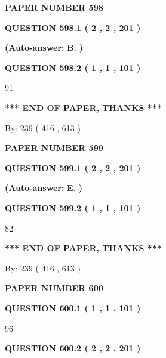 \documentclass[12pt]{article}
\begin{document}
   
\newpage 
\setcounter{page}{ 
   598001 } 
   
   
 {\textbf{ \Large{ PAPER NUMBER  598  }}}
   
   
   
   
  
  
{\textbf{\large{QUESTION
598.1 
 ( 2 , 2 , 201 )
}}}
 
 
{\textbf{(Auto-answer:}}
{\textbf{\large{
B.}}}
{\textbf{)}}
 
 
  
  
{\textbf{\large{QUESTION
598.2 
 ( 1 , 1 , 101 )
}}}

91
   
   
   
   
\vspace{1.0in} 
{\textbf{\large{ *** END OF PAPER, THANKS *** }}} 
   
   
\hspace{1.0in} By: 
 239 ( 416 ,  613 )
   
   
   
   
\newpage 
\setcounter{page}{ 
   599001 } 
   
   
 {\textbf{ \Large{ PAPER NUMBER  599  }}}
   
   
   
   
  
  
{\textbf{\large{QUESTION
599.1 
 ( 2 , 2 , 201 )
}}}
 
 
{\textbf{(Auto-answer:}}
{\textbf{\large{
E.}}}
{\textbf{)}}
 
 
  
  
{\textbf{\large{QUESTION
599.2 
 ( 1 , 1 , 101 )
}}}

82
   
   
   
   
\vspace{1.0in} 
{\textbf{\large{ *** END OF PAPER, THANKS *** }}} 
   
   
\hspace{1.0in} By: 
 239 ( 416 ,  613 )
   
   
   
   
\newpage 
\setcounter{page}{ 
   600001 } 
   
   
 {\textbf{ \Large{ PAPER NUMBER  600  }}}
   
   
   
   
  
  
{\textbf{\large{QUESTION
600.1 
 ( 1 , 1 , 101 )
}}}

96
  
  
{\textbf{\large{QUESTION
600.2 
 ( 2 , 2 , 201 )
}}}
 
\end{document}

